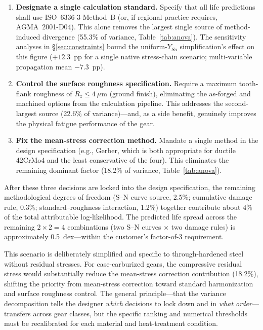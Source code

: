\documentclass[twocolumn,12pt,a4paper]{article}
\begin{document}
\begin{enumerate}
  \item \textbf{Designate a single calculation standard.} Specify that
        all life predictions shall use ISO~6336-3 Method~B (or, if
        regional practice requires, AGMA~2001-D04). This alone removes
        the largest single source of method-induced divergence (55.3\%
        of variance, Table~\ref{tab:anova}). The sensitivity analyses in
        \S\ref{sec:constraints} bound the uniform-$Y_{Sa}$
        simplification's effect on this figure ($+12.3$~pp for a single
        native stress-chain scenario; multi-variable propagation mean
        $-7.3$~pp).
  \item \textbf{Control the surface roughness specification.} Require a
        maximum tooth-flank roughness of $R_z \leq 4~\mu$m (ground
        finish), eliminating the as-forged and machined options from the
        calculation pipeline. This addresses the second-largest source
        (22.6\% of variance)---and, as a side benefit, genuinely
        improves the physical fatigue performance of the gear.
  \item \textbf{Fix the mean-stress correction method.} Mandate a single
        method in the design specification (e.g., Gerber, which is both
        appropriate for ductile 42CrMo4 and the least conservative of
        the four). This eliminates the remaining dominant factor
        (18.2\% of variance, Table~\ref{tab:anova}).
\end{enumerate}

After these three decisions are locked into the design specification,
the remaining methodological degrees of freedom (S--N curve source,
2.5\%; cumulative damage rule, 0.3\%; standard--roughness interaction,
1.2\%) together contribute about 4\% of the total attributable
log-likelihood. The
predicted life spread across the remaining $2 \times 2 = 4$
combinations (two S--N curves $\times$ two damage rules) is
approximately 0.5~dex---within the customer's factor-of-3 requirement.

This scenario is deliberately simplified and specific to
through-hardened steel without residual stresses. For case-carburized
gears, the compressive residual stress would substantially reduce the
mean-stress correction contribution (18.2\%), shifting the priority
from mean-stress correction toward standard harmonization and surface
roughness control. The general principle---that the variance
decomposition tells the designer \emph{which} decisions to lock down
and in \emph{what order}---transfers across gear classes, but the
specific ranking and numerical thresholds must be recalibrated for
each material and heat-treatment condition.
\end{document}
